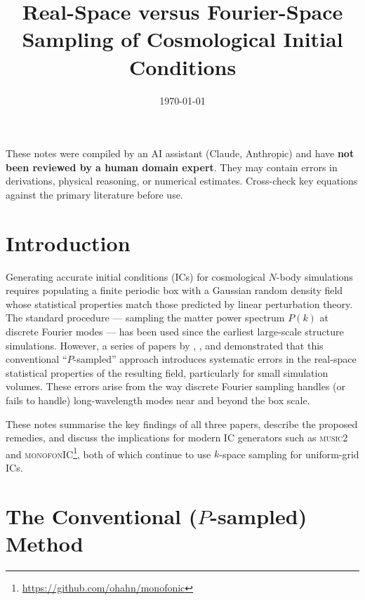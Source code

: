 \documentclass[12pt]{article}
\title{Real-Space versus Fourier-Space Sampling of Cosmological Initial Conditions}
\author{}
\date{\today}
\begin{document}
\maketitle
\tableofcontents
\newpage

\begin{tcolorbox}[colback=yellow!10!white, colframe=orange!75!black,
                  title={\bfseries Disclaimer}]
These notes were compiled by an AI assistant (Claude, Anthropic) and have
\textbf{not been reviewed by a human domain expert}.  They may contain
errors in derivations, physical reasoning, or numerical estimates.
Cross-check key equations against the primary literature before use.
\end{tcolorbox}
\vspace{0.5em}

\section{Introduction}

Generating accurate initial conditions (ICs) for cosmological $N$-body
simulations requires populating a finite periodic box with a Gaussian
random density field whose statistical properties match those predicted
by linear perturbation theory. The standard procedure --- sampling the
matter power spectrum $P(k)$ at discrete Fourier modes --- has been used
since the earliest large-scale structure simulations. However, a series
of papers by \citet{Pen1997}, \citet{Sirko2005}, and \citet{Hahn2011}
demonstrated that this conventional ``$P$-sampled'' approach introduces
systematic errors in the real-space statistical properties of the
resulting field, particularly for small simulation volumes. These errors
arise from the way discrete Fourier sampling handles (or fails to handle)
long-wavelength modes near and beyond the box scale.

These notes summarise the key findings of all three papers, describe the
proposed remedies, and discuss the implications for modern IC generators
such as \textsc{music2} \citep{Hahn2011} and
\textsc{monofonIC}\footnote{\url{https://github.com/ohahn/monofonic}},
both of which continue to use $k$-space sampling for uniform-grid ICs.

\section{The Conventional ($P$-sampled) Method}
\label{sec:conventional}
\end{document}

